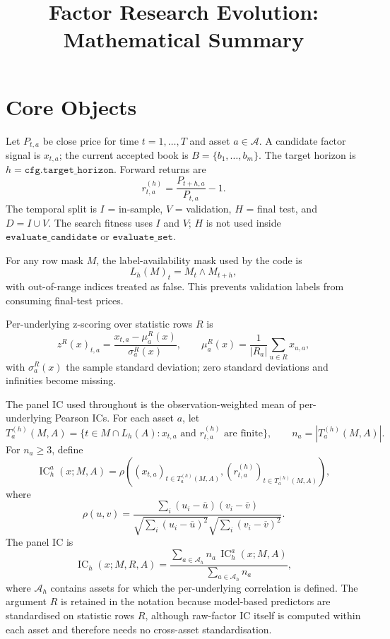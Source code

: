 \documentclass[11pt]{article}
\title{Factor Research Evolution: Mathematical Summary}
\date{}
\newcommand{\IC}{\operatorname{IC}}
\begin{document}
\maketitle

\section*{Core Objects}

Let \(P_{t,a}\) be close price for time \(t=1,\dots,T\) and asset
\(a\in\mathcal A\).  A candidate factor signal is \(x_{t,a}\); the current
accepted book is \(B=\{b_1,\dots,b_m\}\).  The target horizon is
\(h=\texttt{cfg.target\_horizon}\).  Forward returns are
\[
  r^{(h)}_{t,a}=\frac{P_{t+h,a}}{P_{t,a}}-1.
\]
The temporal split is \(I\) = in-sample, \(V\) = validation, \(H\) = final test,
and \(D=I\cup V\).  The search fitness uses \(I\) and \(V\); \(H\) is not used
inside \(\texttt{evaluate\_candidate}\) or \(\texttt{evaluate\_set}\).

For any row mask \(M\), the label-availability mask used by the code is
\[
  L_h(M)_t = M_t \land M_{t+h},
\]
with out-of-range indices treated as false.  This prevents validation labels
from consuming final-test prices.

Per-underlying z-scoring over statistic rows \(R\) is
\[
  z^R(x)_{t,a}=\frac{x_{t,a}-\mu^R_a(x)}{\sigma^R_a(x)},\qquad
  \mu^R_a(x)=\frac{1}{|R_a|}\sum_{u\in R}x_{u,a},
\]
with \(\sigma^R_a(x)\) the sample standard deviation; zero standard deviations
and infinities become missing.

The panel IC used throughout is the observation-weighted mean of per-underlying
Pearson ICs.  For each asset \(a\), let
\[
  T_a^{(h)}(M,A)
  =
  \{t\in M\cap L_h(A): x_{t,a}\text{ and }r^{(h)}_{t,a}
    \text{ are finite}\},
  \qquad n_a=|T_a^{(h)}(M,A)|.
\]
For \(n_a\ge 3\), define
\[
  \IC_h^a(x;M,A)
  =
  \rho\!\left(
    (x_{t,a})_{t\in T_a^{(h)}(M,A)},
    (r^{(h)}_{t,a})_{t\in T_a^{(h)}(M,A)}
  \right),
\]
where
\[
  \rho(u,v)=
  \frac{\sum_i(u_i-\overline u)(v_i-\overline v)}
       {\sqrt{\sum_i(u_i-\overline u)^2}
        \sqrt{\sum_i(v_i-\overline v)^2}}.
\]
The panel IC is
\[
  \IC_h(x;M,R,A)
  =
  \frac{\sum_{a\in\mathcal A_h} n_a\,\IC_h^a(x;M,A)}
       {\sum_{a\in\mathcal A_h} n_a},
\]
where \(\mathcal A_h\) contains assets for which the per-underlying correlation is
defined.  The argument \(R\) is retained in the notation because model-based
predictors are standardised on statistic rows \(R\), although raw-factor IC itself
is computed within each asset and therefore needs no cross-asset standardisation.
\end{document}
